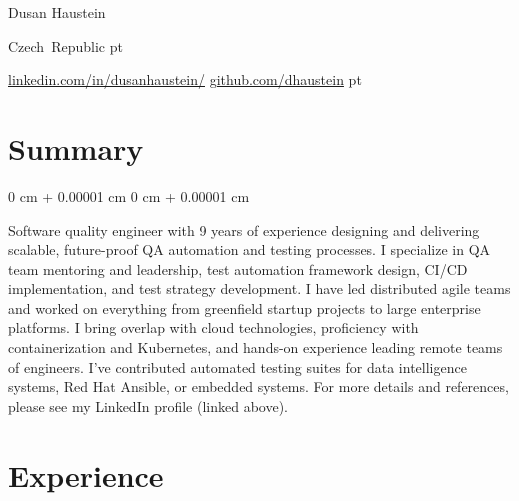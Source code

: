\documentclass[10pt, a4paper]{article}
\newenvironment{onecolentry}{
    \begin{adjustwidth}{
        0 cm + 0.00001 cm
    }{
        0 cm + 0.00001 cm
    }
}{
    \end{adjustwidth}
} %
\newenvironment{header}{
    \setlength{\topsep}{0pt}\par\kern\topsep\centering\linespread{1.5}
}{
    \par\kern\topsep
} %
\let\hrefWithoutArrow\href
\newcommand{\AND}{$|$}
\begin{document}
    \begin{header}
        \fontsize{25 pt}{25 pt}\selectfont Dusan Haustein

        \vspace{5 pt}

        \normalsize
        \mbox{Czech Republic}%
         pt%

        \mbox{\hrefWithoutArrow{https://www.linkedin.com/in/dusanhaustein/}{linkedin.com/in/dusanhaustein/}}
        \hspace{35.0 pt}%
        \mbox{\hrefWithoutArrow{https://github.com/dhaustein}{github.com/dhaustein}}%
         pt%

    \end{header}

    \vspace{5 pt - 0.3 cm}


    \section{Summary}

        \begin{onecolentry}
            \justifying
            Software quality engineer with 9 years of experience designing and delivering scalable, future-proof QA automation and testing processes.
            I specialize in QA team mentoring and leadership, test automation framework design, CI/CD implementation, and test strategy development.
            I have led distributed agile teams and worked on everything from greenfield startup projects to large enterprise platforms.
            I bring overlap with cloud technologies, proficiency with containerization and Kubernetes, and hands-on experience leading remote teams of engineers.
            I've contributed automated testing suites for data intelligence systems, Red Hat Ansible, or embedded systems.
            For more details and references, please see my LinkedIn profile (linked above).
        \end{onecolentry}

        \vspace{0.2 cm}



    \section{Experience}
\end{document}
